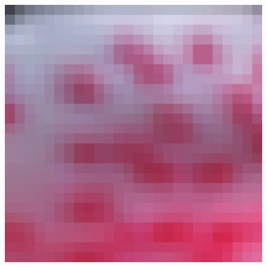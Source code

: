 \documentclass[review,numbers,sort&compress]{elsarticle}  %
\begin{document}
\begin{figure}[htbp]
{\begin{minipage}[b]{0.12\textwidth}
                \includegraphics[width=1\textwidth]{compareImage/Bicubic_flowers_mag_2.png}
            \end{minipage}
        }
\end{figure}
\end{document}
